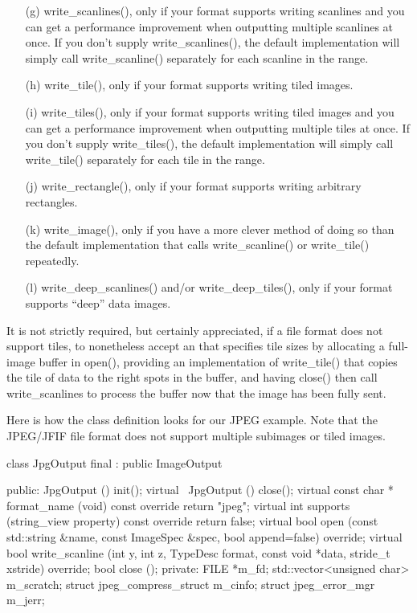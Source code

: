 \begin{enumerate}
  \begin{enumerate}
    \item[(g)] {\cf write_scanlines()}, only if your format supports
      writing scanlines and you can get a performance improvement when
      outputting multiple scanlines at once.  If you don't supply
      {\cf write_scanlines()}, the default implementation will simply
      call {\cf write_scanline()} separately for each scanline in the
      range.
    \item[(h)] {\cf write_tile()}, only if your format supports
      writing tiled images.
    \item[(i)] {\cf write_tiles()}, only if your format supports
      writing tiled images and you can get a performance improvement
      when outputting multiple tiles at once.  If you don't supply
      {\cf write_tiles()}, the default implementation will simply
      call {\cf write_tile()} separately for each tile in the range.
    \item[(j)] {\cf write_rectangle()}, only if your format supports
      writing arbitrary rectangles.
    \item[(k)] {\cf write_image()}, only if you have a more clever
      method of doing so than the default implementation that calls
      {\cf write_scanline()} or {\cf write_tile()} repeatedly.
    \item[(l)] {\cf write_deep_scanlines()} and/or 
      {\cf write_deep_tiles()}, only if your format supports
      ``deep'' data images.
  \end{enumerate}

  It is not strictly required, but certainly appreciated, if a file format
  does not support tiles, to nonetheless accept an \ImageSpec that specifies
  tile sizes by allocating a full-image buffer in {\cf open()}, providing an
  implementation of {\cf write_tile()} that copies the tile of data to the
  right spots in the buffer, and having {\cf close()} then call 
  {\cf write_scanlines} to process the buffer now that the image has been
  fully sent.

  Here is how the class definition looks for our JPEG example.  Note
  that the JPEG/JFIF file format does not support multiple subimages
  or tiled images.

  \begin{code}
    class JpgOutput final : public ImageOutput {
     public:
        JpgOutput () { init(); }
        virtual ~JpgOutput () { close(); }
        virtual const char * format_name (void) const override { return "jpeg"; }
        virtual int supports (string_view property) const override { return false; }
        virtual bool open (const std::string &name, const ImageSpec &spec,
                           bool append=false) override;
        virtual bool write_scanline (int y, int z, TypeDesc format,
                                     const void *data, stride_t xstride) override;
        bool close ();
     private:
        FILE *m_fd;
        std::vector<unsigned char> m_scratch;
        struct jpeg_compress_struct m_cinfo;
        struct jpeg_error_mgr m_jerr;

}
\end{code}
\end{enumerate}
